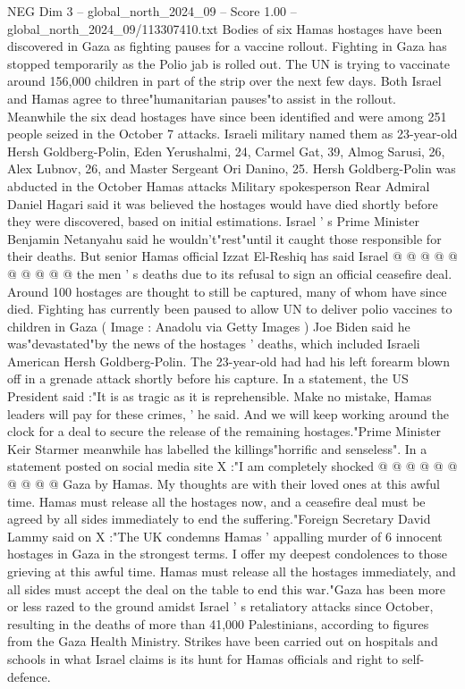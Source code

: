 \begin{textsample}{NEG Dim 3 – global\_north\_2024\_09 – Score 1.00 – global\_north\_2024\_09/113307410.txt}  \label{ex:f3_neg_294}
Bodies of six Hamas hostages have been discovered in Gaza as fighting pauses for a vaccine rollout.
Fighting in Gaza has stopped temporarily as the Polio jab is rolled out.
The UN is trying to vaccinate around 156,000 children in part of the strip over the next few days.
Both Israel and Hamas agree to three"humanitarian pauses"to assist in the rollout.
Meanwhile the six dead hostages have since been identified and were among 251 people seized in the October 7 attacks.
Israeli military named them as 23-year-old Hersh Goldberg-Polin, Eden Yerushalmi, 24, Carmel Gat, 39, Almog Sarusi, 26, Alex Lubnov, 26, and Master Sergeant Ori Danino, 25.
Hersh Goldberg-Polin was abducted in the October Hamas attacks Military spokesperson Rear Admiral Daniel Hagari said it was believed the hostages would have died shortly before they were discovered, based on initial estimations.
Israel ' s Prime Minister Benjamin Netanyahu said he wouldn't"rest"until it caught those responsible for their deaths.
But senior Hamas official Izzat El-Reshiq has said Israel @ @ @ @ @ @ @ @ @ @ the men ' s deaths due to its refusal to sign an official ceasefire deal.
Around 100 hostages are thought to still be captured, many of whom have since died.
Fighting has currently been paused to allow UN to deliver polio vaccines to children in Gaza ( Image : Anadolu via Getty Images ) Joe Biden said he was"devastated"by the news of the hostages ' deaths, which included Israeli American Hersh Goldberg-Polin.
The 23-year-old had had his left forearm blown off in a grenade attack shortly before his capture.
In a statement, the US President said :"It is as tragic as it is reprehensible.
Make no mistake, Hamas leaders will pay for these crimes, ' he said.
And we will keep working around the clock for a deal to secure the release of the remaining hostages."Prime Minister Keir Starmer meanwhile has labelled the killings"horrific and senseless".
In a statement posted on social media site X :"I am completely shocked @ @ @ @ @ @ @ @ @ @ Gaza by Hamas.
My thoughts are with their loved ones at this awful time.
Hamas must release all the hostages now, and a ceasefire deal must be agreed by all sides immediately to end the suffering."Foreign Secretary David Lammy said on X :"The UK condemns Hamas ' appalling murder of 6 innocent hostages in Gaza in the strongest terms.
I offer my deepest condolences to those grieving at this awful time.
Hamas must release all the hostages immediately, and all sides must accept the deal on the table to end this war."Gaza has been more or less razed to the ground amidst Israel ' s retaliatory attacks since October, resulting in the deaths of more than 41,000 Palestinians, according to figures from the Gaza Health Ministry.
Strikes have been carried out on hospitals and schools in what Israel claims is its hunt for Hamas officials and right to self-defence.

\end{textsample}
